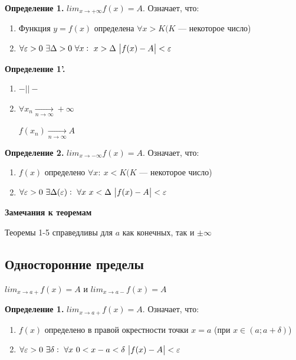 \documentclass{article}
\begin{document}
  \textbf{Определение 1.} \(lim_{x \rightarrow +\infty} f(x) = A\). Означает, что:
  \begin{enumerate}
    \item Функция \(y = f(x)\) определена \(\forall x > K(K\) --- некоторое число)
    \item \(\forall \varepsilon > 0\ \exists \Delta > 0\ \forall x:\ x > \Delta\ \abs{f(x)-A} < \varepsilon\)
  \end{enumerate}

  \textbf{Определение 1'.} 
  \begin{enumerate}
    \item \(-||-\)
    \item \( \forall x_n \xrightarrow[n \rightarrow \infty]{} +\infty \)
    
    \(f(x_n) \xrightarrow[n \rightarrow \infty]{} A\)
  \end{enumerate}

  
  \textbf{Определение 2.} \(lim_{x \rightarrow -\infty} f(x) = A\). Означает, что:
  \begin{enumerate}
    \item \(f(x)\) определено \(\forall x:\ x < K(K\) --- некоторое число)
    \item \(\forall \varepsilon > 0\ \exists \Delta(\varepsilon):\ \forall x\ x < \Delta\ \abs{f(x)-A}<\varepsilon\)
  \end{enumerate}


  \textbf{Замечания к теоремам}
  
  Теоремы 1-5 справедливы для \(a\) как конечных, так и \(\pm\infty\)
  
  \subsection{Односторонние пределы}

  \( lim_{x \rightarrow a+} f(x) = A \) и \( lim_{x \rightarrow a-} f(x) = A \)

  \textbf{Определение 1.} \( lim_{x \rightarrow a+} f(x) = A \). Означает, что:

  \begin{enumerate}
    \item \(f(x)\) определено в правой окрестности точки \(x = a\) (при \( x \in (a; a + \delta) \))
    \item \(\forall \varepsilon > 0\ \exists \delta:\ \forall x\ 0 < x-a < \delta\ \abs{f(x)-A}<\varepsilon\)
  \end{enumerate}
\end{document}
